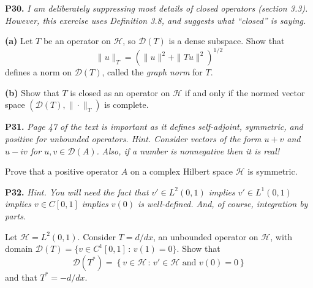 \documentclass[12pt]{amsart}
\newcommand{\cD}{\mathcal{D}}
\newcommand{\cH}{\mathcal{H}}
\newcommand{\prob}[1]{\bigskip\noindent\textbf{#1.}\quad }
\newcommand{\epart}[1]{\medskip\noindent\textbf{(#1)}\quad }
\begin{document}
\prob{P30} \emph{I am deliberately suppressing most details of \emph{closed} operators (section 3.3).  However, this exercise uses Definition 3.8, and suggests what ``closed'' is saying.}

\epart{a} Let $T$ be an operator on $\cH$, so $\cD(T)$ is a dense subspace.  Show that
	$$\|u\|_T = \left(\|u\|^2 + \|Tu\|^2\right)^{1/2}$$
defines a norm on $\cD(T)$, called the \emph{graph norm} for $T$.

\epart{b} Show that $T$ is closed as an operator on $\cH$ if and only if the normed vector space $(\cD(T),\|\cdot\|_T)$ is complete.


\clearpage\newpage
\prob{P31} \emph{Page 47 of the text is important as it defines \emph{self-adjoint}, \emph{symmetric}, and \emph{positive} for unbounded operators.  Hint. Consider vectors of the form $u+v$ and $u-iv$ for $u,v\in\cD(A)$.  Also, if a number is nonnegative then it is real!}

\medskip\noindent Prove that a positive operator $A$ on a complex Hilbert space $\cH$ is symmetric.


\prob{P32}  \emph{Hint.  You will need the fact that $v' \in L^2(0,1)$ implies $v' \in L^1(0,1)$ implies $v \in C[0,1]$ implies $v(0)$ is well-defined.  And, of course, integration by parts.}

\medskip\noindent Let $\cH=L^2(0,1)$.  Consider $T=d/dx$, an unbounded operator on $\cH$, with domain $\cD(T) = \{v\in C^1[0,1]\,:\,v(1)=0\}$.  Show that
    $$\cD(T^*) = \left\{v\in \cH\,:\,v'\in\cH \text{ and } v(0)=0\right\}$$
and that $T^*=-d/dx$.
\end{document}
